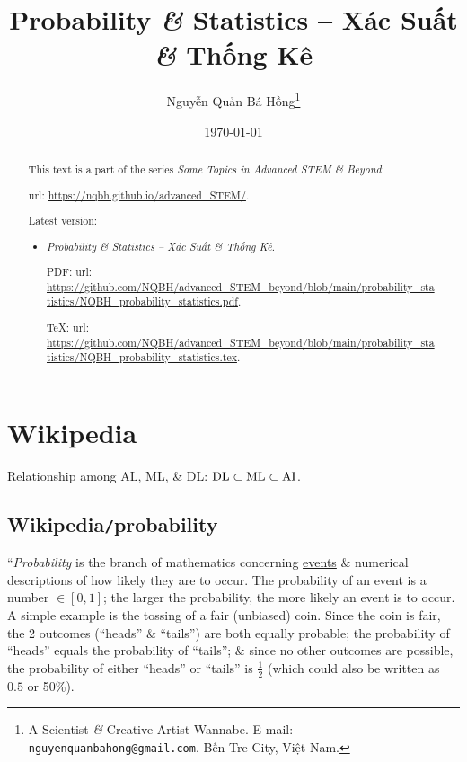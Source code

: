 \documentclass{article}
\title{Probability {\it\&} Statistics -- Xác Suất {\it\&} Thống Kê}
\author{Nguyễn Quản Bá Hồng\footnote{A Scientist {\it\&} Creative Artist Wannabe. E-mail: {\tt nguyenquanbahong@gmail.com}. Bến Tre City, Việt Nam.}}
\date{\today}
\begin{document}
\maketitle
\begin{abstract}
	This text is a part of the series {\it Some Topics in Advanced STEM \& Beyond}:
	
	{\sc url}: \url{https://nqbh.github.io/advanced_STEM/}.
	
	Latest version:
	\begin{itemize}
		\item {\it Probability \& Statistics -- Xác Suất \& Thống Kê}.
		
		PDF: {\sc url}: \url{https://github.com/NQBH/advanced_STEM_beyond/blob/main/probability_statistics/NQBH_probability_statistics.pdf}.
		
		\TeX: {\sc url}: \url{https://github.com/NQBH/advanced_STEM_beyond/blob/main/probability_statistics/NQBH_probability_statistics.tex}.
	\end{itemize}
\end{abstract}
\tableofcontents


\section{Wikipedia}
{\sf Relationship among AL, ML, \& DL}: $\rm DL\subset ML\subset AI$.


\subsection{Wikipedia{\tt/}probability}
``{\it Probability} is the branch of mathematics concerning \href{https://en.wikipedia.org/wiki/Event_(probability_theory)}{events} \& numerical descriptions of how likely they are to occur. The probability of an event is a number $\in[0,1]$; the larger the probability, the more likely an event is to occur. A simple example is the tossing of a fair (unbiased) coin. Since the coin is fair, the 2 outcomes (``heads'' \& ``tails'') are both equally probable; the probability of ``heads'' equals the probability of ``tails''; \& since no other outcomes are possible, the probability of either ``heads'' or ``tails'' is $\frac{1}{2}$ (which could also be written as $0.5$ or 50\%).
\end{document}
